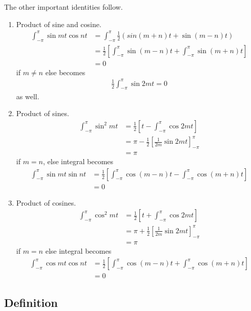The other important identities follow.
\begin{enumerate}
    \item Product of sine and cosine.
    \begin{align*}
        \int_{-\pi}^\pi \sin mt\cos nt &= \int_{-\pi}^\pi \frac{1}{2}\left(sin(m+n)t + \sin(m-n)t\right)\\
        &= \frac{1}{2} \left[ \int_{-\pi}^\pi \sin (m-n)t + \int_{-\pi}^\pi \sin(m+n)t \right]\\
        &= 0
    \end{align*}
    if $m\neq n$ else becomes
    \begin{align*}
        \frac{1}{2}\int_{-\pi}^\pi \sin 2mt = 0
    \end{align*}
    as well.
    \item Product of sines.
    \begin{align*}
        \int_{-\pi}^\pi \sin^2mt &= \frac{1}{2}\left[t - \int_{-\pi}^\pi \cos 2mt\right]\\
        &= \pi - \frac{1}{2}\left[\frac{1}{2m}\sin 2mt\right]_{-\pi}^\pi\\
        &= \pi
    \end{align*}
    if $m=n$, else integral becomes
    \begin{align*}
        \int_{-\pi}^\pi \sin mt\sin nt &= \frac{1}{2}\left[\int_{-\pi}^\pi\cos (m-n)t - \int_{-\pi}^\pi\cos(m+n)t\right]\\
        &= 0
    \end{align*}
    \item Product of cosines. 
    \begin{align*}
        \int_{-\pi}^\pi \cos^2mt &= \frac{1}{2}\left[t + \int_{-\pi}^\pi \cos 2mt\right]\\
        &= \pi + \frac{1}{2}\left[\frac{1}{2m}\sin 2mt\right]_{-\pi}^\pi\\
        &= \pi
    \end{align*}
    if $m=n$ else integral becomes
    \begin{align*}
        \int_{-\pi}^\pi \cos mt\cos nt &= \frac{1}{2}\left[\int_{-\pi}^\pi\cos (m-n)t + \int_{-\pi}^\pi\cos(m+n)t\right]\\
        &= 0
    \end{align*}
\end{enumerate}

\subsection{Definition}

